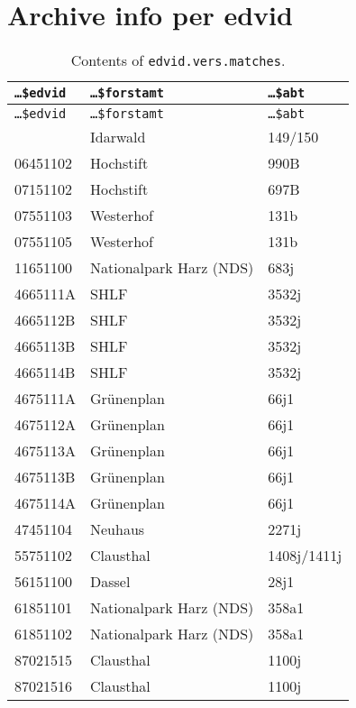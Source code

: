 \section{Archive info per edvid}

\begin{singlespace}
  {\tabulinesep=2mm
    \begin{longtabu}{l l L}
      \caption{Contents of \texttt{edvid.vers.matches}.} \\
      \toprule
      \texttt{\dots{}\$edvid} & \texttt{\dots{}\$forstamt} & \texttt{\dots{}\$abt} \\
      \midrule
      \endfirsthead
      \texttt{\dots{}\$edvid} & \texttt{\dots{}\$forstamt} & \texttt{\dots{}\$abt} \\
      \midrule
      \endhead
      \bottomrule
       & Idarwald & 149/150 \\
      06451102 & Hochstift & 990B \\
      07151102 & Hochstift & 697B \\
      07551103 & Westerhof & 131b \\
      07551105 & Westerhof & 131b \\
      11651100 & Nationalpark Harz (NDS) & 683j \\
      4665111A & SHLF & 3532j \\
      4665112B & SHLF & 3532j \\
      4665113B & SHLF & 3532j \\
      4665114B & SHLF & 3532j \\
      4675111A & Grünenplan & 66j1 \\
      4675112A & Grünenplan & 66j1 \\
      4675113A & Grünenplan & 66j1 \\
      4675113B & Grünenplan & 66j1 \\
      4675114A & Grünenplan & 66j1 \\
      47451104 & Neuhaus & 2271j \\
      55751102 & Clausthal & 1408j/1411j \\
      56151100 & Dassel & 28j1 \\
      61851101 & Nationalpark Harz (NDS) & 358a1 \\
      61851102 & Nationalpark Harz (NDS) & 358a1 \\
      87021515 & Clausthal & 1100j \\
      87021516 & Clausthal & 1100j \\

\end{longtabu}}
\end{singlespace}
